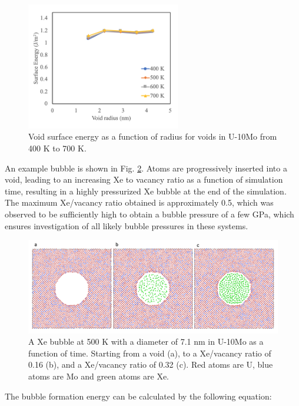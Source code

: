 \documentclass[review]{elsarticle}
\begin{document}
\begin{figure}[h]
 \centering
 \includegraphics[width=0.6\textwidth]{1_void_Esurf.png} 
 \caption{Void surface energy as a function of radius for voids in U-10Mo from 400 K to 700 K.}
 \label{fig:voidE}
\end{figure}

An example bubble is shown in Fig. \ref{fig:bubex}. Atoms are progressively inserted into a void, leading to an increasing Xe to vacancy ratio as a function of simulation time, resulting in a highly pressurized Xe bubble at the end of the simulation. The maximum Xe/vacancy ratio obtained is approximately 0.5, which was observed to be sufficiently high to obtain a bubble pressure of a few GPa, which ensures investigation of all likely bubble pressures in these systems. 


\begin{figure}[h]
 \centering
 \includegraphics[width=1.0\textwidth]{2_bubex.png} 
 \caption{A Xe bubble at 500 K with a diameter of 7.1 nm in U-10Mo as a function of time. Starting from a void (a), to a Xe/vacancy ratio of 0.16 (b), and a Xe/vacancy ratio of 0.32 (c). Red atoms are U, blue atoms are Mo and green atoms are Xe. }
 \label{fig:bubex}
\end{figure}

\FloatBarrier

The bubble formation energy can be calculated by the following equation:
\end{document}
